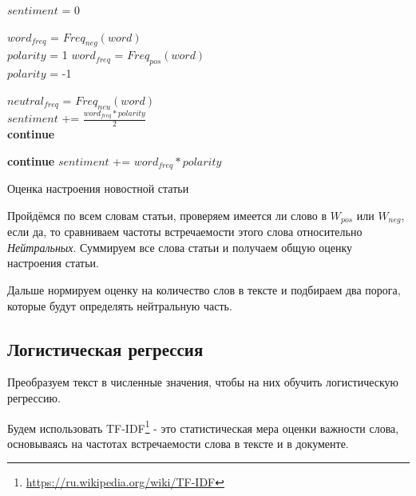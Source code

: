 \documentclass[12pt]{article}
\begin{document}
            \begin{algorithm}[H]
                $sentiment$ = 0

                 {
                     {
                        $word_{freq}$ = $Freq_{neg}(word)$\\
                        $polarity$ = 1
                    }
                     {
                        $word_{freq}$ = $Freq_{pos}(word)$\\
                        $polarity$ = -1
                    }

                     {
                        $neutral_{freq}$ = $Freq_{neu}(word)$\\
                        
                         {
                            $sentiment$ += $\frac{word_{freq}* polarity}{2}$\\
                            \textbf{continue}
                        }

                         {
                            \textbf{continue}
                        }
                        $sentiment$ += $word_{freq}* polarity$
                    }
                }
                \caption{Оценка настроения новостной статьи}
            \end{algorithm}

            Пройдёмся по всем словам статьи, проверяем имеется ли слово в $W_{pos}$ или $W_{neg}$,
            если да, то сравниваем частоты встречаемости этого слова относительно \textit{Нейтральных}.
            Суммируем все слова статьи и получаем общую оценку настроения статьи.

            Дальше нормируем оценку на количество слов в тексте и подбираем два порога, которые будут
            определять нейтральную часть. 
            
        \subsection{Логистическая регрессия}
            Преобразуем текст в численные значения, чтобы на них обучить логистическую регрессию.

            
            Будем использовать TF-IDF\footnote{\href{https://ru.wikipedia.org/wiki/TF-IDF}{https://ru.wikipedia.org/wiki/TF-IDF}}
            - это статистическая мера оценки важности слова, основываясь на частотах встречаемости слова в тексте и в документе.
\end{document}

